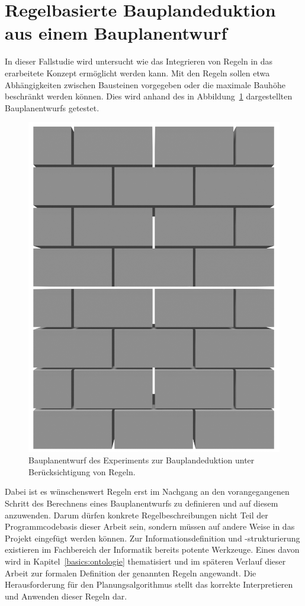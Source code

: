 \section{Regelbasierte Bauplandeduktion aus einem Bauplanentwurf}\label{scenarios:scenario4}
In dieser Fallstudie wird untersucht wie das Integrieren von Regeln in das erarbeitete Konzept ermöglicht werden kann.
Mit den Regeln sollen etwa Abhängigkeiten zwischen Bausteinen vorgegeben oder die maximale Bauhöhe beschränkt werden können.
Dies wird anhand des in Abbildung~\ref{fig:scenarios:Scenario4 Experiment} dargestellten Bauplanentwurfs getestet.
\begin{figure}[ht]
  \centering
  \includegraphics[width=0.3\columnwidth]{fig/scenario4_render.png}
  \caption{Bauplanentwurf des Experiments zur Bauplandeduktion unter Berücksichtigung von Regeln.}\label{fig:scenarios:Scenario4 Experiment}
\end{figure}
Dabei ist es wünschenswert Regeln erst im Nachgang an den vorangegangenen Schritt des Berechnens eines Bauplanentwurfs zu definieren und auf diesem anzuwenden.
Darum dürfen konkrete Regelbeschreibungen nicht Teil der Programmcodebasis dieser Arbeit sein, sondern müssen auf andere Weise in das Projekt eingefügt werden können.
Zur Informationsdefinition und -strukturierung existieren im Fachbereich der Informatik bereits potente Werkzeuge.
Eines davon wird in Kapitel~\ref{basics:ontologie} thematisiert und im späteren Verlauf dieser Arbeit zur formalen Definition der genannten Regeln angewandt.
Die Herausforderung für den Planungsalgorithmus stellt das korrekte Interpretieren und Anwenden dieser Regeln dar.
